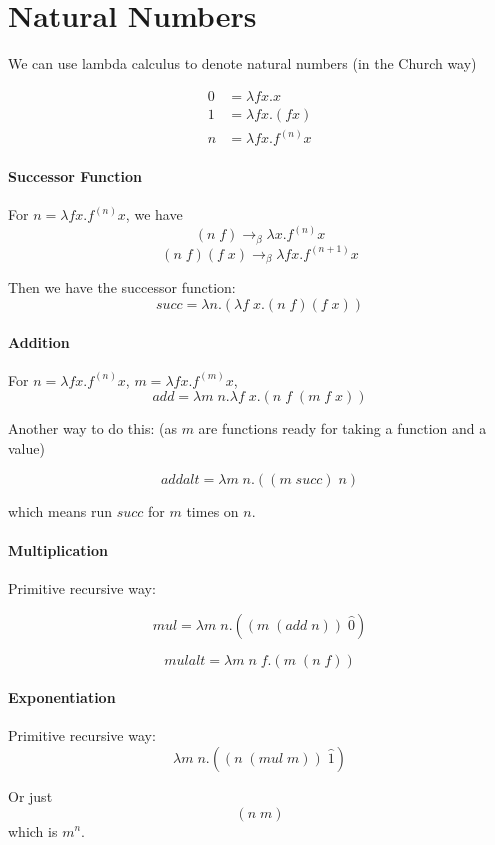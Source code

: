 \section{Natural Numbers}

We can use lambda calculus to denote natural numbers (in the Church way)

\begin{align*}
0 &= \lambda f x.x \\
1 &= \lambda f x.(f x) \\
n &= \lambda f x.f^{(n)} x
\end{align*}

\paragraph{Successor Function} For \(n = \lambda f x.f^{(n)} x\), we have
$$(n\;f) \rightarrow_{\beta} \lambda x. f^{(n)} x$$
$$(n\;f)(f\;x) \rightarrow_{\beta} \lambda f x.f^{(n+1)}x$$

Then we have the successor function:
$$succ = \lambda n. (\lambda f\;x.(n\;f)(f\;x))$$

\paragraph{Addition} For \(n = \lambda f x.f^{(n)} x\),
\(m = \lambda f x.f^{(m)} x\),
$$add = \lambda m\;n.\lambda f\;x .(n\;f\;(m\;f\;x))$$

Another way to do this: (as \(m\) are functions ready for taking a
function and a value)

$$addalt = \lambda m\;n.((m\; succ)\;n)$$

which means run \(succ\) for \(m\) times on \(n\).

\paragraph{Multiplication} Primitive recursive way:

$$mul=\lambda m\;n.((m\;(add\;n))\;\hat{0})$$

$$mulalt=\lambda m\;n\;f.(m\;(n\;f))$$


\paragraph{Exponentiation} Primitive recursive way:
$$\lambda m\;n.((n\;(mul\;m))\;\hat{1})$$

Or just $$(n\;m)$$ which is \(m^n\).
